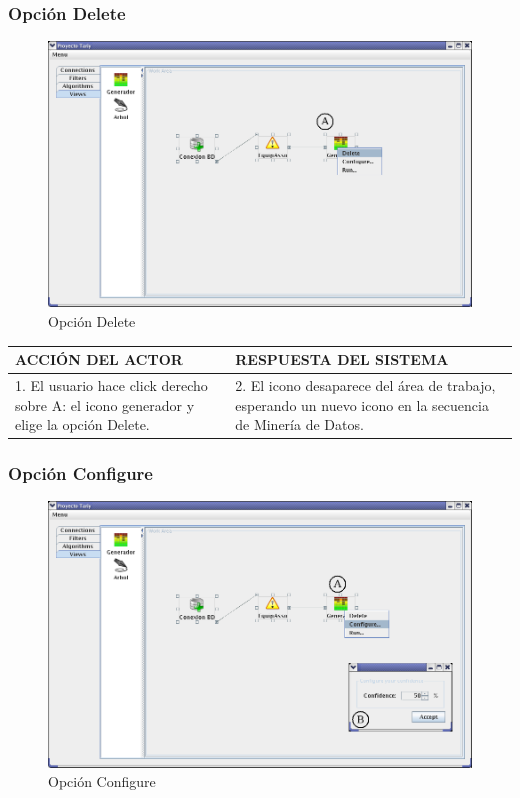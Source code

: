\subsubsection{Opci\'on Delete}
\begin{figure}[h]
 \centering
 \includegraphics[width=1\textwidth]{images/v0m1.png}
 \caption{Opci\'on Delete}
\end{figure}

\begin{center}
\begin{tabular}{|p{60mm}|p{60mm}|}\hline
ACCI\'ON DEL ACTOR & RESPUESTA DEL SISTEMA \\ \hline
1. El usuario hace click derecho sobre A: el icono generador y elige la opci\'on Delete.
& 2. El icono desaparece del \'area de trabajo, esperando un nuevo icono en la secuencia de Miner\'ia de Datos. \\
\hline
\end{tabular}
\end{center}
\newpage

\subsubsection{Opci\'on Configure}
\begin{figure}[h]
 \centering
 \includegraphics[width=1\textwidth]{images/v0m2.png}
 \caption{Opci\'on Configure}
\end{figure}

